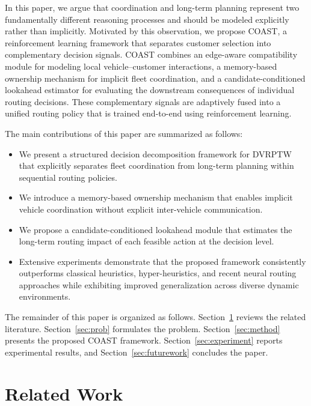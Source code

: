 \documentclass[letterpaper]{article}
\begin{document}
In this paper, we argue that coordination and long-term planning represent two fundamentally different reasoning processes and should be modeled explicitly rather than implicitly. Motivated by this observation, we propose COAST, a reinforcement learning framework that separates customer selection into complementary decision signals. COAST combines an edge-aware compatibility module for modeling local vehicle--customer interactions, a memory-based ownership mechanism for implicit fleet coordination, and a candidate-conditioned lookahead estimator for evaluating the downstream consequences of individual routing decisions. These complementary signals are adaptively fused into a unified routing policy that is trained end-to-end using reinforcement learning.

The main contributions of this paper are summarized as follows:

\begin{itemize}
    \item We present a structured decision decomposition framework for DVRPTW that explicitly separates fleet coordination from long-term planning within sequential routing policies.
    \item We introduce a memory-based ownership mechanism that enables implicit vehicle coordination without explicit inter-vehicle communication.
    \item We propose a candidate-conditioned lookahead module that estimates the long-term routing impact of each feasible action at the decision level.
    \item Extensive experiments demonstrate that the proposed framework consistently outperforms classical heuristics, hyper-heuristics, and recent neural routing approaches while exhibiting improved generalization across diverse dynamic environments.
\end{itemize}

The remainder of this paper is organized as follows. Section~\ref{sec:related} reviews the related literature. Section~\ref{sec:prob} formulates the problem. Section~\ref{sec:method} presents the proposed COAST framework. Section~\ref{sec:experiment} reports experimental results, and Section~\ref{sec:futurework} concludes the paper.



\section{Related Work}
\label{sec:related}
\end{document}
